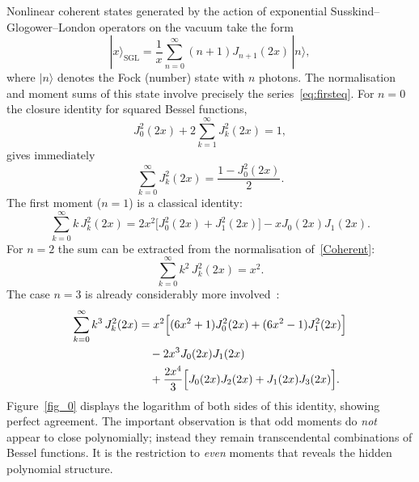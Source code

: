 \documentclass[10pt]{NSP1}
\begin{document}
Nonlinear coherent states generated by the action of exponential Susskind--Glogower--London 
operators on the vacuum take the form~\cite{RevMexFis,Gazeau}
\begin{equation}\label{Coherent}
|x\rangle_{\mathrm{SGL}}=\frac{1}{x}\sum_{n=0}^{\infty}(n+1)J_{n+1}(2x)\,|n\rangle,
\end{equation}
where $|n\rangle$ denotes the Fock (number) state with $n$ photons.  The normalisation and 
moment sums of this state involve precisely the series~\eqref{eq:firsteq}.  For $n=0$ the 
closure identity for squared Bessel functions,
\begin{equation}
J_0^2(2x)+2\sum_{k=1}^{\infty}J_k^2(2x)=1,
\end{equation}
gives immediately
\begin{equation}
\sum_{k=0}^{\infty}J_k^2(2x)=\frac{1-J_0^2(2x)}{2}.
\end{equation}
The first moment ($n=1$) is a classical identity:
\begin{equation}
\sum_{k=0}^{\infty}k\,J_k^2(2x)=2x^2\bigl[J_0^2(2x)+J_1^2(2x)\bigr]-xJ_0(2x)J_1(2x).
\end{equation}
For $n=2$ the sum can be extracted from the normalisation of~\eqref{Coherent}:
\begin{equation}\label{eq:firsttwo}
\sum_{k=0}^{\infty}k^2\,J_k^2(2x)=x^2.
\end{equation}
The case $n=3$ is already considerably more involved~\cite{RevMexFis}:
\begin{align}
\sum_{k=0}^{\infty}k^{3}\,J_k^2(2x)
&= x^2\Bigl[(6x^2+1)J_0^2(2x)+(6x^2-1)J_1^2(2x)\Bigr] \nonumber\\
&\quad - 2x^3 J_0(2x)J_1(2x) \nonumber\\
&\quad + \frac{2x^4}{3}\Bigl[J_0(2x)J_2(2x)+J_1(2x)J_3(2x)\Bigr].
\end{align}
Figure~\ref{fig_0} displays the logarithm of both sides of this identity, showing perfect 
agreement.  The important observation is that odd moments do \emph{not} appear to close 
polynomially; instead they remain transcendental combinations of Bessel functions.  It is the 
restriction to \emph{even} moments that reveals the hidden polynomial structure.
\end{document}
